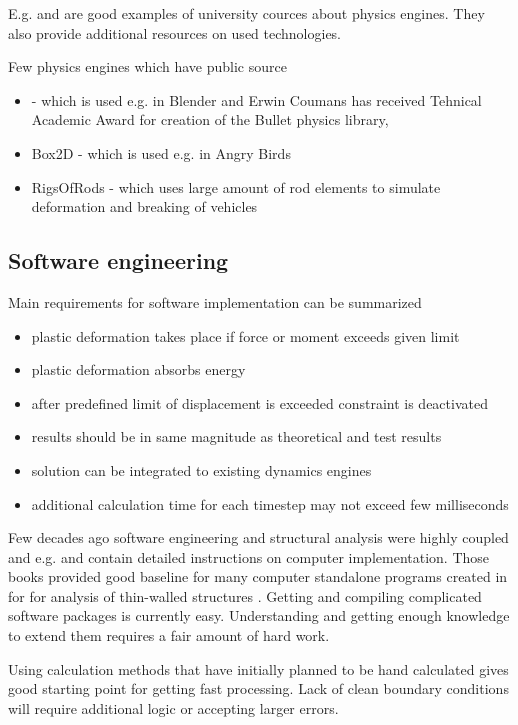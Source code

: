 E.g. \cite{cornell.cs3152} and \cite{cornell.cs5643} are good examples of  university cources
about physics engines. They also provide additional resources on used technologies.

Few physics engines which have public source

\begin{itemize}
\item \bullet - \cite{bullet} which is used e.g. in Blender and Erwin Coumans
 has received Tehnical Academic Award for creation of the Bullet physics library, \cite{erwin.oscar}
\item Box2D - \cite{box2d} which is used e.g. in Angry Birds
\item RigsOfRods - \cite{ror} which uses large amount of rod elements to simulate deformation and breaking of vehicles
\end{itemize}


\subsection{Software engineering}

Main requirements for software implementation can be summarized
\begin{itemize}
\item plastic deformation takes place if force or moment exceeds given limit
\item plastic deformation absorbs energy
\item after predefined limit of displacement is exceeded constraint is deactivated 
\item results should be in same magnitude as theoretical and test results
\item solution can be integrated to existing dynamics engines
\item additional calculation time for each timestep may not exceed few milliseconds 
\end{itemize}

Few decades ago software engineering and structural analysis were highly coupled
and e.g. \cite{bathe} and \cite{cook} contain detailed instructions on
computer implementation. Those books provided good baseline for many computer 
standalone programs created in \lut for for analysis of 
thin-walled structures \cite{agifap,fsm,vtb}.  
Getting and compiling complicated software packages is currently easy. 
Understanding and getting enough knowledge to extend them requires a fair amount of hard work.

Using calculation methods that have initially planned to be hand calculated gives good starting point for 
getting fast processing. Lack of clean boundary conditions will require additional logic or accepting larger errors.


